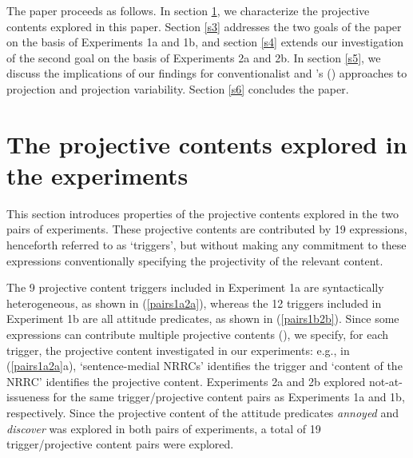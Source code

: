 \documentclass[11pt,fleqn]{article}
\newcommand{\6}{\mbox{$[\hspace*{-.6mm}[$}}
\newcommand{\9}{\mbox{$]\hspace*{-.6mm}]$}}
\newcommand{\citetpos}[1]{\citeauthor{#1}'s (\citeyear{#1})}
\begin{document}
The paper proceeds as follows. In section \ref{s2}, we characterize the projective contents explored in this paper. Section \ref{s3} addresses the two goals of the paper on the basis of Experiments 1a and 1b, and section \ref{s4} extends our investigation of the second goal on the basis of Experiments 2a and 2b. In section \ref{s5}, we discuss the implications of our findings for conventionalist and \citetpos{brst-salt10} approaches to projection and projection variability. Section \ref{s6} concludes the paper.

\section{The projective contents explored in the experiments}\label{s2}

This section introduces properties of the projective contents explored in the two pairs of experiments. These projective contents are contributed by 19 expressions, henceforth referred to as `triggers', but without making any commitment to these expressions conventionally specifying the projectivity of the relevant content. 

The 9 projective content triggers included in Experiment 1a are syntactically heterogeneous, as shown in (\ref{pairs1a2a}), whereas the 12 triggers included in Experiment 1b are all attitude predicates, as shown in (\ref{pairs1b2b}). Since some expressions can contribute multiple projective contents (\citealt{brst-lang11}), we specify, for each trigger, the projective content investigated in our experiments: e.g., in (\ref{pairs1a2a}a), `sentence-medial NRRCs' identifies the trigger and `content of the NRRC' identifies the projective content. Experiments 2a and 2b explored not-at-issueness for the same trigger/projective content pairs as Experiments 1a and 1b, respectively. Since the projective content of the attitude predicates {\em annoyed} and {\em discover} was explored in both pairs of experiments, a total of 19 trigger/projective content pairs were explored. 
\end{document}
